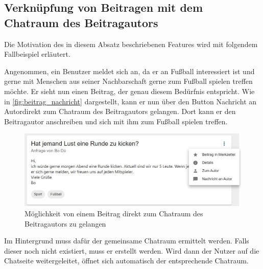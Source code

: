 \subsection{Verknüpfung von Beitragen mit dem Chatraum des Beitragautors}
\label{sec:beitrag_chat_verknüpfung}

Die Motivation des in diesem Absatz beschriebenen Features wird mit folgendem Fallbeispiel erläutert.

Angenommen, ein Benutzer meldet sich an, da er an Fußball interessiert ist und gerne mit Menschen aus seiner Nachbarschaft gerne zum Fußball spielen treffen möchte. Er sieht nun einen Beitrag, der genau diesem Bedürfnis entspricht. Wie in \autoref{fig:beitrag_nachricht} dargestellt, kann er nun über den Button \glqq Nachricht an Autor\grqq direkt zum Chatraum des Beitragautors gelangen. Dort kann er den Beitragautor anschreiben und sich mit ihm zum Fußball spielen treffen.

\begin{figure}[!htb]
    \centering
    \includegraphics[width=.7\textwidth]{figures/boas/21_beitrag_nachricht.jpg}
    \caption[]{Möglichkeit von einem Beitrag direkt zum Chatraum des Beitragautors zu gelangen}
    \label{fig:beitrag_nachricht}
\end{figure}

Im Hintergrund muss dafür der gemeinsame Chatraum ermittelt werden. Falls dieser noch nicht existiert, muss er erstellt werden. Wird dann der Nutzer auf die Chatseite weitergeleitet, öffnet sich automatisch der entsprechende Chatraum.
